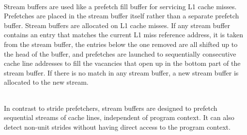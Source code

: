 \documentclass{article}
\begin{document}
\\Stream buffers are used like a prefetch fill buffer for servicing L1 cache misses. Prefetches are placed in the stream buffer itself rather than a separate prefetch buffer. Stream buffers are allocated on L1 cache misses. If any stream buffer contains an entry that matches the current L1 miss reference address, it is taken from the stream buffer, the entries below the one removed are all shifted up to the head of the buffer, and prefetches are launched to sequentially consecutive cache line addresses to fill the vacancies that open up in the bottom part of the stream buffer. If there is no match in any stream buffer, a new stream buffer is allocated to the new stream. 

\\In contrast to stride prefetchers, stream buffers are designed to prefetch sequential streams of cache lines, independent of program context. It can also detect non-unit strides without having direct access to the program context. 
\end{document}
